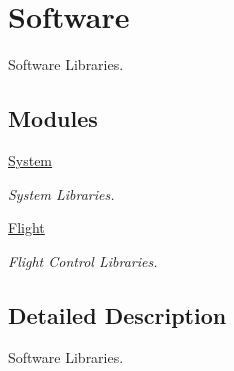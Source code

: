 \hypertarget{group___software}{\section{Software}
\label{group___software}
}


Software Libraries.  


\subsection*{Modules}
\begin{DoxyCompactItemize}
\item 
\hyperlink{group___system}{System}
\begin{DoxyCompactList}\small\item\em System Libraries. \end{DoxyCompactList}\item 
\hyperlink{group___flight}{Flight}
\begin{DoxyCompactList}\small\item\em Flight Control Libraries. \end{DoxyCompactList}\end{DoxyCompactItemize}


\subsection{Detailed Description}
Software Libraries. 